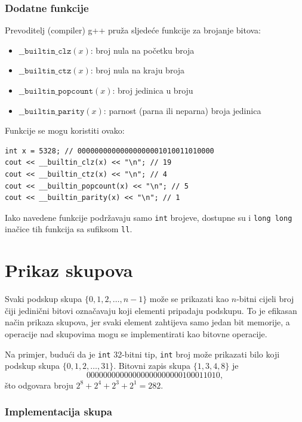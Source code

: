 \subsubsection*{Dodatne funkcije}

Prevoditelj (compiler) g++ pruža sljedeće
funkcije za brojanje bitova:

\begin{itemize}
\item
$\texttt{\_\_builtin\_clz}(x)$:
broj nula na početku broja
\item
$\texttt{\_\_builtin\_ctz}(x)$:
broj nula na kraju broja
\item
$\texttt{\_\_builtin\_popcount}(x)$:
broj jedinica u broju
\item
$\texttt{\_\_builtin\_parity}(x)$:
parnost (parna ili neparna) broja jedinica
\end{itemize}
\begin{samepage}

Funkcije se mogu koristiti ovako:
\begin{lstlisting}
int x = 5328; // 00000000000000000001010011010000
cout << __builtin_clz(x) << "\n"; // 19
cout << __builtin_ctz(x) << "\n"; // 4
cout << __builtin_popcount(x) << "\n"; // 5
cout << __builtin_parity(x) << "\n"; // 1
\end{lstlisting}
\end{samepage}

Iako navedene funkcije podržavaju samo \texttt{int} brojeve,
dostupne su i \texttt{long long} inačice
tih funkcija sa sufiksom \texttt{ll}.

\section{Prikaz skupova}

Svaki podskup skupa
$\{0,1,2,\ldots,n-1\}$
može se prikazati kao $n$-bitni cijeli broj
čiji jedinični bitovi označavaju koji
elementi pripadaju podskupu.
To je efikasan način prikaza skupova,
jer svaki element zahtijeva samo jedan bit memorije,
a operacije nad skupovima mogu se implementirati kao bitovne operacije.

Na primjer, budući da je \texttt{int} 32-bitni tip,
\texttt{int} broj može prikazati bilo koji podskup
skupa $\{0,1,2,\ldots,31\}$.
Bitovni zapis skupa $\{1,3,4,8\}$ je
\[00000000000000000000000100011010,\]
što odgovara broju $2^8+2^4+2^3+2^1=282$.

\subsubsection{Implementacija skupa}

